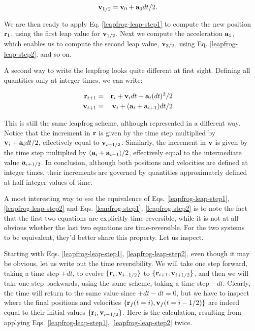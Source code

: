 \begin{equation}
{\bf v}_{1/2} = {\bf v}_0 + {\bf a}_0 dt / 2.
\end{equation}

We are then ready to apply Eq. \ref{leapfrog-leap-step1} to compute
the new position ${\bf r}_1$, using the first leap value for ${\bf v}_{1/2}$.
Next we compute the acceleration ${\bf a}_1$, which enables us to compute
the second leap value, ${\bf v}_{3/2}$, using Eq. \ref{leapfrog-leap-step2},
and so on.

A second way to write the leapfrog looks quite different at first sight.
Defining all quantities only at integer times, we can write:

\begin{eqnarray}
\br_{i+1} & = & \br_i + \bv_{i} dt + \ba_{i} (dt)^2/2 \label{leapfrog-step1} \\
\bv_{i+1} & = & \bv_i + (\ba_i + \ba_{i+1})dt / 2 \label{leapfrog-step2}
\end{eqnarray}

This is still the same leapfrog scheme, although represented in a
different way.  Notice that the increment in ${\bf r}$ is given by the
time step multiplied by ${\bf v}_{i}  + {\bf a}_{i} dt/ 2$, effectively equal
to ${\bf v}_{i+ 1/2}$.  Similarly, the increment in ${\bf v}$ is given by the
time step multiplied by $({\bf a}_i + {\bf a}_{i+1}) / 2$, effectively equal
to the intermediate value ${\bf a}_{i+1/2}$.  In conclusion, although both
positions and velocities are defined at integer times, their
increments are governed by quantities approximately defined at
half-integer values of time.

A most interesting way to see the equivalence of
Eqs. \ref{leapfrog-leap-step1}, \ref{leapfrog-leap-step2} and 
Eqs. \ref{leapfrog-step1}, \ref{leapfrog-step2} is to note the fact
that the first two equations are explicitly time-reversible, while it
is not at all obvious whether the last two equations are time-reversible.
For the two systems to be equivalent, they'd better share this property.
Let us inspect.

Starting with Eqs. \ref{leapfrog-leap-step1}, \ref{leapfrog-leap-step2},
even though it may be obvious, let us write out the time reversibility.
We will take one step forward, taking a time step $+dt$, to evolve
$\{{\bf r}_i, {\bf v}_{i-1/2}\}$ to $\{{\bf r}_{i+1}, {\bf v}_{i+1/2}\}$, and then we
will take one step backwards, using the same scheme, taking a time
step $-dt$.  Clearly, the time will return to the same value since
$+dt-dt=0$, but we have to inspect where the final positions and
velocities $\{{\bf r}_f(t=i), {\bf v}_f(t=i-1/2)\}$ are indeed equal to their
initial values $\{{\bf r}_i, {\bf v}_{i-1/2}\}$.  Here is the calculation, resulting
from applying Eqs. \ref{leapfrog-leap-step1}, \ref{leapfrog-leap-step2} twice.

